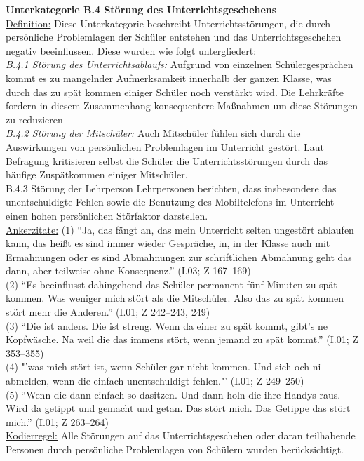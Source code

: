 \textbf{Unterkategorie B.4 Störung des Unterrichtsgeschehens}\\
\underline{Definition:} Diese Unterkategorie beschreibt Unterrichtsstörungen, die durch persönliche Problemlagen der Schüler entstehen und das Unterrichtsgeschehen negativ beeinflussen. Diese wurden wie folgt untergliedert: \\
\textit{B.4.1 Störung des Unterrichtsablaufs:} Aufgrund von einzelnen Schülergesprächen kommt es zu mangelnder Aufmerksamkeit innerhalb der ganzen Klasse, was durch das zu spät kommen einiger Schüler noch verstärkt wird. Die Lehrkräfte fordern in diesem Zusammenhang konsequentere Maßnahmen um diese Störungen zu reduzieren \\
\textit{B.4.2 Störung der Mitschüler:} Auch Mitschüler fühlen sich durch die Auswirkungen von persönlichen Problemlagen im Unterricht gestört. Laut Befragung kritisieren selbst die Schüler die Unterrichtsstörungen durch das häufige Zuspätkommen einiger Mitschüler.\\
B.4.3 Störung der Lehrperson Lehrpersonen berichten, dass insbesondere das unentschuldigte Fehlen sowie die Benutzung des Mobiltelefons im Unterricht einen hohen persönlichen Störfaktor darstellen. \\
\underline{Ankerzitate:} (1) "`Ja, das fängt an, das mein Unterricht selten ungestört ablaufen kann, das heißt es sind immer wieder Gespräche, in, in der Klasse auch mit Ermahnungen oder es sind Abmahnungen zur schriftlichen Abmahnung geht das dann, aber teilweise ohne Konsequenz."' (I.03; Z 167--169)\\ (2) "`Es beeinflusst dahingehend das Schüler permanent fünf Minuten zu spät kommen. Was weniger mich stört als die Mitschüler. Also das zu spät kommen stört mehr die Anderen."' (I.01; Z 242--243, 249)\\ (3) "`Die ist anders. Die ist streng. Wenn da einer zu spät kommt, gibt’s ne Kopfwäsche. Na weil die das immens stört, wenn jemand zu spät kommt."' (I.01; Z 353--355)\\ (4) "'was mich stört ist, wenn Schüler gar nicht kommen. Und sich och ni abmelden, wenn die einfach unentschuldigt fehlen."' (I.01; Z 249--250)\\ (5) "`Wenn die dann einfach so dasitzen. Und dann holn die ihre Handys raus. Wird da getippt und gemacht und getan. Das stört mich. Das Getippe das stört mich."' (I.01; Z 263--264)\\
\underline{Kodierregel:}  Alle Störungen auf das Unterrichtsgeschehen oder daran teilhabende Personen durch persönliche Problemlagen von Schülern wurden berücksichtigt.\\

